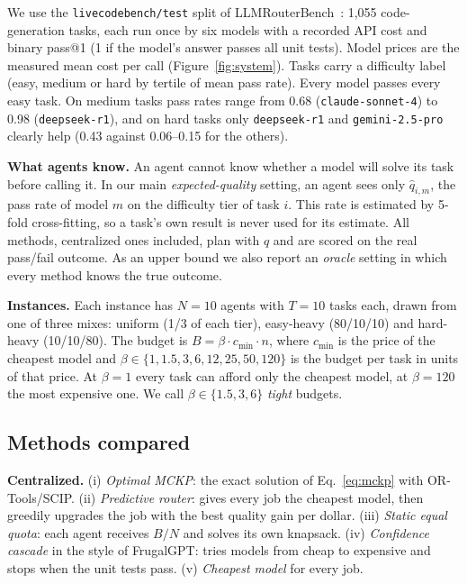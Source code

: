 \documentclass{article}
\begin{document}
We use the \texttt{livecodebench/test} split of LLMRouterBench~\cite{llmrouterbench}: 1,055 code-generation tasks, each run once by six models with a recorded API cost and binary pass@1 (1 if the model's answer passes all unit tests). Model prices are the measured mean cost per call (Figure~\ref{fig:system}). Tasks carry a difficulty label (easy, medium or hard by tertile of mean pass rate). Every model passes every easy task. On medium tasks pass rates range from 0.68 (\texttt{claude-sonnet-4}) to 0.98 (\texttt{deepseek-r1}), and on hard tasks only \texttt{deepseek-r1} and \texttt{gemini-2.5-pro} clearly help (0.43 against 0.06--0.15 for the others).

\textbf{What agents know.} An agent cannot know whether a model will solve its task before calling it. In our main \emph{expected-quality} setting, an agent sees only $\hat q_{i,m}$, the pass rate of model $m$ on the difficulty tier of task $i$. This rate is estimated by 5-fold cross-fitting, so a task's own result is never used for its estimate. All methods, centralized ones included, plan with $\hat q$ and are scored on the real pass/fail outcome. As an upper bound we also report an \emph{oracle} setting in which every method knows the true outcome.

\textbf{Instances.} Each instance has $N{=}10$ agents with $T{=}10$ tasks each, drawn from one of three mixes: uniform (1/3 of each tier), easy-heavy (80/10/10) and hard-heavy (10/10/80). The budget is $B = \beta \cdot c_{\min} \cdot n$, where $c_{\min}$ is the price of the cheapest model and $\beta \in \{1, 1.5, 3, 6, 12, 25, 50, 120\}$ is the budget per task in units of that price. At $\beta{=}1$ every task can afford only the cheapest model, at $\beta{=}120$ the most expensive one. We call $\beta \in\{1.5, 3, 6\}$ \emph{tight} budgets.

\subsection{Methods compared}

\textbf{Centralized.} (i) \emph{Optimal MCKP}: the exact solution of Eq.~\eqref{eq:mckp} with OR-Tools/SCIP. (ii) \emph{Predictive router}: gives every job the cheapest model, then greedily upgrades the job with the best quality gain per dollar. (iii) \emph{Static equal quota}: each agent receives $B/N$ and solves its own knapsack. (iv) \emph{Confidence cascade} in the style of FrugalGPT: tries models from cheap to expensive and stops when the unit tests pass. (v) \emph{Cheapest model} for every job.
\end{document}
